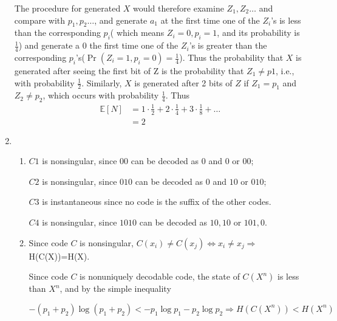 \documentclass{article}
\def\E{\mathbb{E}}
\begin{document}
\begin{enumerate}
The procedure for generated $X$ would therefore examine $Z_1,Z_2\dots$ and compare with
$p_1, p_2\dots$, and generate $a_1$ at the first time one of the $Z_i$'s is less than the corresponding $p_i$( which means $Z_i=0,p_i=1$, and its probability is $\frac{1}{4}$) and generate a $0$ the first time one of the $Z_i$'s is greater than the corresponding $p_i$'s($\Pr(Z_i=1,p_i=0)=\frac{1}{4}$).
Thus the probability that $X$ is generated after seeing the first bit of Z is the
probability that $Z_1 \neq p 1$, i.e., with probability $\frac{1}{2}$.
Similarly, $X$ is generated after 2 bits of $Z$ if $Z_1 = p_1$ and $Z_2 \neq p_2$, which occurs with probability $\frac{1}{4}$. Thus
\begin{align*}
\E[N] & = 1\cdot \frac{1}{2}+ 2\cdot \frac{1}{4} + 3\cdot \frac{1}{8} + \dots\\
      & = 2
\end{align*}
\item 
\begin{enumerate}[label=(\alph*)] 
\item 
$C1$ is nonsingular, since $00$ can be decoded as $0$ and $0$ or $00$;

$C2$ is nonsingular, since $010$ can be decoded as $0$ and $10$ or $010$;

$C3$ is instantaneous since no code is the suffix of the other codes.

$C4$ is nonsingular, since $1010$ can be decoded as $10,10$ or $101,0$.
\item 
Since code $C$ is nonsingular, $C(x_i)\neq C(x_j) \iff x_i \neq x_j \Rightarrow$
H(C(X))=H(X).

Since code $C$ is nonuniquely decodable code, the state of $C(X^n)$ is less than $X^n$, and by the simple inequality

$
-(p_1+p_2)\log(p_1+p_2) < -p_1\log p_1 - p_2\log p_2 \Rightarrow H(C(X^n))<H(X^n)
$


\end{enumerate}
\end{enumerate}
\end{document}

